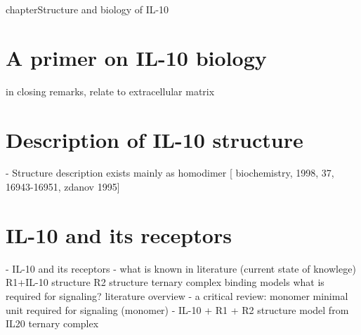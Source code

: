 chapter{Structure and biology of IL-10}


\section{A primer on IL-10 biology}

        in closing remarks, relate to extracellular matrix

\section{Description of IL-10 structure}

    - Structure description
        exists mainly as homodimer [
            biochemistry, 1998, 37, 16943-16951, zdanov 1995]

\section{IL-10 and its receptors}

    - IL-10 and its receptors
        - what is known in literature (current state of knowlege)
            R1+IL-10 structure
            R2 structure
            ternary complex binding models
            what is required for signaling? literature overview
        - a critical review: monomer
            minimal unit required for signaling (monomer)
        - IL-10 + R1 + R2 structure model from IL20 ternary complex


\lipsum[1-5]
